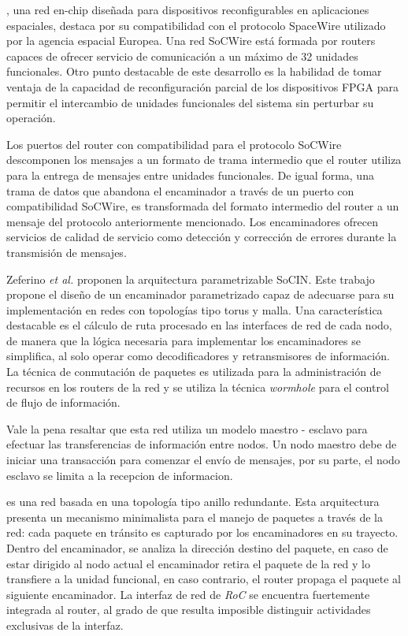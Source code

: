 \cite{chapter3:584254, chapter3:5546220}, una red en-chip diseñada para dispositivos reconfigurables en aplicaciones espaciales, destaca por su compatibilidad con el protocolo SpaceWire\cite{chapter3:4584258, chapter3:1547397, chapter3:1655950, chapter3:4526504, chapter3:5197252} utilizado por la agencia espacial Europea. Una red SoCWire está formada por routers capaces de ofrecer servicio de comunicación a un máximo de 32 unidades funcionales. Otro punto destacable de este desarrollo es la habilidad de tomar ventaja de la capacidad de reconfiguración parcial\cite{chapter3:PR:Xilinx} de los dispositivos FPGA para permitir el intercambio de unidades funcionales del sistema sin perturbar su operación.

Los puertos del router con compatibilidad para el protocolo SoCWire descomponen los mensajes a un formato de trama intermedio que el router utiliza para la entrega de mensajes entre unidades funcionales. De igual forma, una trama de datos que abandona el encaminador a través de un puerto con compatibilidad SoCWire, es transformada del formato intermedio del router a un mensaje del protocolo anteriormente mencionado. Los encaminadores ofrecen servicios de calidad de servicio como detección y corrección de errores durante la transmisión de mensajes.

Zeferino \textit{et al.} proponen la arquitectura parametrizable SoCIN\cite{chapter3:1232824}. Este trabajo propone el diseño de un encaminador parametrizado capaz de adecuarse para su implementación en redes con topologías tipo torus y malla. Una característica destacable es el cálculo de ruta procesado en las interfaces de red de cada nodo, de manera que la lógica necesaria para implementar los encaminadores se simplifica, al solo operar como decodificadores y retransmisores de información. La técnica de conmutación de paquetes es utilizada para la administración de recursos en los routers de la red y se utiliza la técnica \textit{wormhole} para el control de flujo de información.

Vale la pena resaltar que esta red utiliza un modelo maestro - esclavo para efectuar las transferencias de información entre nodos. Un nodo maestro debe de iniciar una transacción para comenzar el envío de mensajes, por su parte, el nodo esclavo se limita a la recepcion de informacion.

\cite{chapter3:4511160, chapter3:4016946} es una red basada en una topología tipo anillo redundante. Esta arquitectura presenta un mecanismo minimalista para el manejo de paquetes a través de la red: cada paquete en tránsito es capturado por los encaminadores en su trayecto. Dentro del encaminador, se analiza la dirección destino del paquete, en caso de estar dirigido al nodo actual el encaminador retira el paquete de la red y lo transfiere a la unidad funcional, en caso contrario, el router propaga el paquete al siguiente encaminador. La interfaz de red de \textit{RoC} se encuentra fuertemente integrada al router, al grado de que resulta imposible distinguir actividades exclusivas de la interfaz. 

